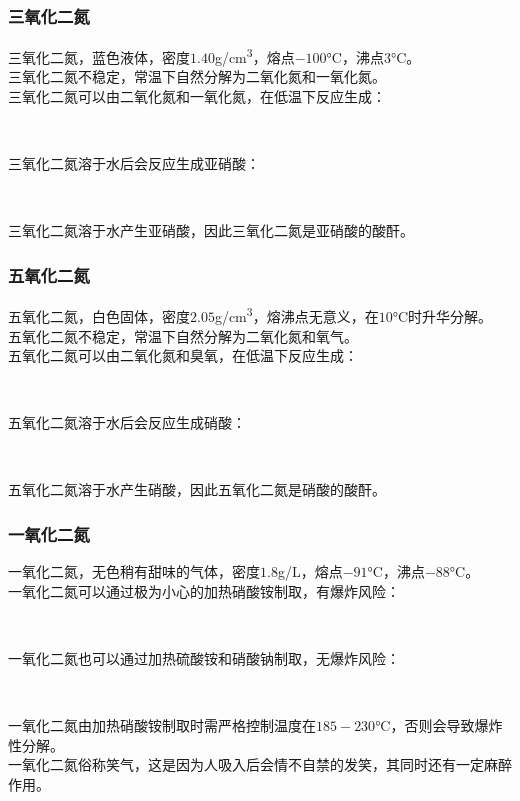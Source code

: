 \documentclass[UTF8]{ctexart}
\begin{document}
\subsubsection{三氧化二氮}
    三氧化二氮，蓝色液体，密度$1.40$\si{g/cm^3}，熔点$-100$\si{\degreeCelsius}，沸点$3$\si{\degreeCelsius}。\\[3mm]
    三氧化二氮不稳定，常温下自然分解为二氧化氮和一氧化氮。\\[3mm]
    三氧化二氮可以由二氧化氮和一氧化氮，在低温下反应生成：
    \begin{center}
        \\[5mm]
    \end{center}
    三氧化二氮溶于水后会反应生成亚硝酸：
    \begin{center}
        \\[5mm]
    \end{center}
    三氧化二氮溶于水产生亚硝酸，因此三氧化二氮是亚硝酸的酸酐。

\subsubsection{五氧化二氮}
    五氧化二氮，白色固体，密度$2.05$\si{g/cm^3}，熔沸点无意义，在$10$\si{\degreeCelsius}时升华分解。\\[3mm]
    五氧化二氮不稳定，常温下自然分解为二氧化氮和氧气。\\[3mm]
    五氧化二氮可以由二氧化氮和臭氧，在低温下反应生成：
    \begin{center}
        \\[5mm]
    \end{center}
    五氧化二氮溶于水后会反应生成硝酸：
    \begin{center}
        \\[5mm]
    \end{center}
    五氧化二氮溶于水产生硝酸，因此五氧化二氮是硝酸的酸酐。

\newpage

\subsubsection{一氧化二氮}
    一氧化二氮，无色稍有甜味的气体，密度$1.8$\si{g/L}，熔点$-91$\si{\degreeCelsius}，沸点$-88$\si{\degreeCelsius}。\\[3mm]
    一氧化二氮可以通过极为小心的加热硝酸铵制取，有爆炸风险：
    \begin{center}
        \\[6mm]
    \end{center}
    一氧化二氮也可以通过加热硫酸铵和硝酸钠制取，无爆炸风险：
    \begin{center}
        \\[6mm]
    \end{center}
    一氧化二氮由加热硝酸铵制取时需严格控制温度在$185-230$\si{\degreeCelsius}，否则会导致爆炸性分解。\\[3mm]
    一氧化二氮俗称笑气，这是因为人吸入后会情不自禁的发笑，其同时还有一定麻醉作用。
\end{document}
